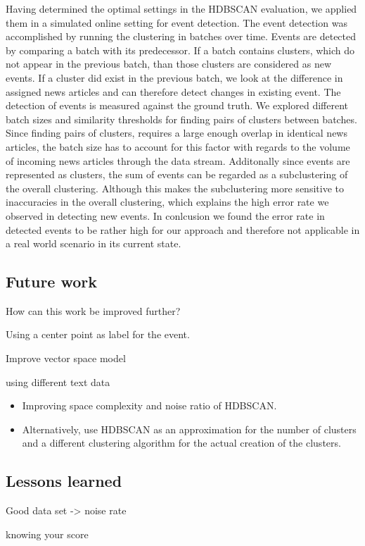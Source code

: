 Having determined the optimal settings in the HDBSCAN evaluation, we applied them in a simulated online setting for event detection. The event detection was accomplished by running the clustering in batches over time. Events are detected by comparing a batch with its predecessor. If a batch contains clusters, which do not appear in the previous batch, than those clusters are considered as new events. If a cluster did exist in the previous batch, we look at the difference in assigned news articles and can therefore detect changes in existing event. The detection of events is measured against the ground truth. We explored different batch sizes and similarity thresholds for finding pairs of clusters between batches. Since finding pairs of clusters, requires a large enough overlap in identical news articles, the batch size has to account for this factor with regards to the volume of incoming news articles through the data stream. Additonally since events are represented as clusters, the sum of events can be regarded as a subclustering of the overall clustering. Although this makes the subclustering more sensitive to inaccuracies in the overall clustering, which explains the high error rate we observed in detecting new events. In conlcusion we found the error rate in detected events to be rather high for our approach and therefore not applicable in a real world scenario in its current state. 

\subsection{Future work}


How can this work be improved further?

Using a center point as label for the event.

Improve vector space model

using different text data 

\begin{itemize}
    \item Improving space complexity and noise ratio of HDBSCAN.
    \item Alternatively, use HDBSCAN as an approximation for the number of clusters and a different clustering algorithm
    for the actual creation of the clusters.
\end{itemize}


\subsection{Lessons learned}
Good data set -> noise rate


knowing your score


